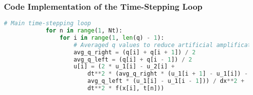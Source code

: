 \documentclass{article}
\begin{document}
		\begin{comment}
			
		\paragraph{Update Rule for Each Time Step}
		
		For each spatial point \( i \) (excluding boundaries), the displacement \( u[i] \) at the current time step is calculated using the following update rule:
		\[
		u[i] = 2 u_1[i] - u_2[i] + \Delta t^2 \left( \frac{q_{i+1/2} (u_1[i+1] - u_1[i]) - q_{i-1/2} (u_1[i] - u_1[i-1])}{\Delta x^2} + f(x[i], t[n]) \right),
		\]
		where:
		- \( u[i] \): Displacement at spatial point \( i \) and current time step.
		- \( u_1[i] \): Displacement at spatial point \( i \) from the previous time step.
		- \( u_2[i] \): Displacement at spatial point \( i \) from two time steps prior.
		- \( \Delta t \): Time step size.
		- \( q_{i+1/2} \) and \( q_{i-1/2} \): Averaged values of \( q(x) = c(x)^2 \), calculated between points \( i \) and \( i+1 \), and points \( i \) and \( i-1 \), respectively, as:
		\[
		q_{i+1/2} = \frac{q[i] + q[i+1]}{2}, \quad q_{i-1/2} = \frac{q[i] + q[i-1]}{2}.
		\]
		
		This update rule relies on values from the previous two time steps, ensuring stability and accurate propagation of the wave through the domain. The averaging of \( q \) values minimizes sharp transitions in wave speed, promoting numerical stability.
		
		\end{comment}
		
		\subsubsection{Code Implementation of the Time-Stepping Loop}
		
		\begin{lstlisting}[language=Python]
			# Main time-stepping loop
			for n in range(1, Nt):
				for i in range(1, len(q) - 1):
					# Averaged q values to reduce artificial amplification
					avg_q_right = (q[i] + q[i + 1]) / 2
					avg_q_left = (q[i] + q[i - 1]) / 2
					u[i] = (2 * u_1[i] - u_2[i] +
						dt**2 * (avg_q_right * (u_1[i + 1] - u_1[i]) - 
						avg_q_left * (u_1[i] - u_1[i - 1])) / dx**2 +
						dt**2 * f(x[i], t[n]))
		\end{lstlisting}
		
\end{document}
